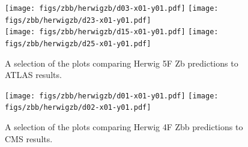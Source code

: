 \documentclass[11pt]{cernrep}
\begin{document}
\begin{figure}[htbp]
\begin{center}
   \texttt{[image: figs/zbb/herwigzb/d03-x01-y01.pdf]} 
   \texttt{[image: figs/zbb/herwigzb/d23-x01-y01.pdf]} \\
   \texttt{[image: figs/zbb/herwigzb/d15-x01-y01.pdf]} 
   \texttt{[image: figs/zbb/herwigzb/d25-x01-y01.pdf]} 
\caption{A selection of the plots comparing Herwig 5F Zb predictions to ATLAS results.}
\label{zbb-herwigzb-atlas}
\end{center}
\end{figure}
\begin{figure}[htbp]
   \texttt{[image: figs/zbb/herwigzb/d01-x01-y01.pdf]} 
   \texttt{[image: figs/zbb/herwigzb/d02-x01-y01.pdf]} 
\caption{A selection of the plots comparing Herwig 4F Zbb predictions to CMS results.}
\label{zbb-herwigzb-cms}
\end{figure}
\end{document}
